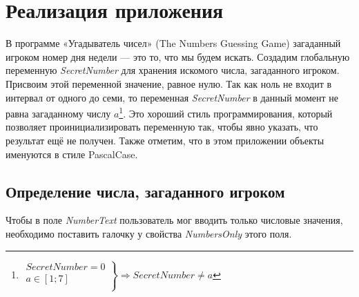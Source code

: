 \section{Реализация приложения}
\label{styles}
В программе «Угадыватель чисел» (The Numbers Guessing Game)\cite{PanfilovaApp} загаданный игроком номер дня недели — это то, что мы будем искать.
Создадим глобальную переменную  \textit{SecretNumber} для хранения искомого числа, загаданного игроком. Присвоим этой переменной значение, равное нулю. 
Так как ноль не входит в интервал от одного до семи, то переменная \textit{SecretNumber} в данный момент не равна загаданному числу $ a $\footnote[][-0cm]{\mbox{$ \left.\begin{array}{ccc}
  SecretNumber = 0 \\
  a \in [1;7] \\
\end{array}
\right\}\Rightarrow SecretNumber \neq a $}}. Это хороший стиль программирования, который позволяет проинициализировать переменную так, чтобы явно указать, что результат ещё не получен. Также
отметим, что в этом приложении объекты именуются в стиле PascalCase\cite{Chase2018}.

\subsection{Определение числа, загаданного игроком}
Чтобы в поле \textit{NumberText} пользователь мог вводить только числовые значения, необходимо поставить галочку у свойства \textit{NumbersOnly} этого поля.

